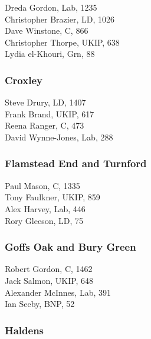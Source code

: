 \documentclass[a4paper,openany,10pt]{book}
\begin{document}


Dreda Gordon, Lab, 1235\\
Christopher Brazier, LD, 1026\\
Dave Winstone, C, 866\\
Christopher Thorpe, UKIP, 638\\
Lydia el-Khouri, Grn, 88\\


\subsubsection*{Croxley}



Steve Drury, LD, 1407\\
Frank Brand, UKIP, 617\\
Reena Ranger, C, 473\\
David Wynne-Jones, Lab, 288\\


\subsubsection*{Flamstead End and Turnford}



Paul Mason, C, 1335\\
Tony Faulkner, UKIP, 859\\
Alex Harvey, Lab, 446\\
Rory Gleeson, LD, 75\\


\subsubsection*{Goffs Oak and Bury Green}



Robert Gordon, C, 1462\\
Jack Salmon, UKIP, 648\\
Alexander McInnes, Lab, 391\\
Ian Seeby, BNP, 52\\


\subsubsection*{Haldens}
\end{document}
